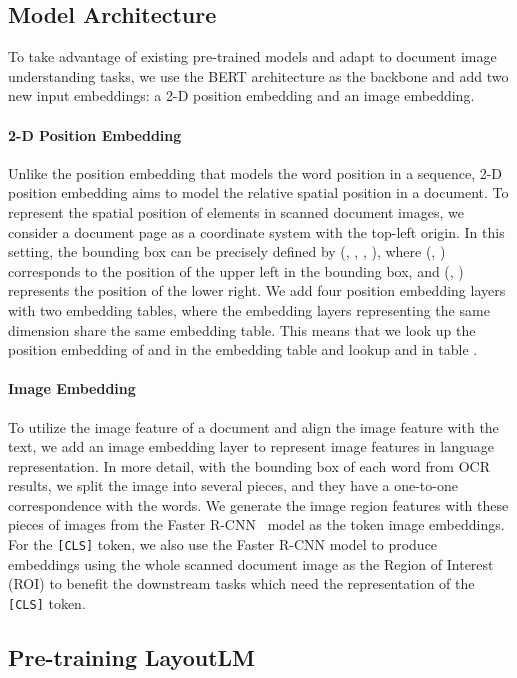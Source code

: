 \documentclass[sigconf]{acmart}
\begin{document}
\subsection{Model Architecture}
To take advantage of existing pre-trained models and adapt to document image understanding tasks, we use the BERT architecture as the backbone and add two new input embeddings: a 2-D position embedding and an image embedding.

\paragraph{2-D Position Embedding}
Unlike the position embedding that models the word position in a sequence, 2-D position embedding aims to model the relative spatial position in a document. To represent the spatial position of elements in scanned document images, we consider a document page as a coordinate system with the top-left origin. In this setting, the bounding box can be precisely defined by (, , , ), where (, ) corresponds to the position of the upper left in the bounding box, and (, ) represents the position of the lower right. We add four position embedding layers with two embedding tables, where the embedding layers representing the same dimension share the same embedding table. This means that we look up the position embedding of  and  in the embedding table  and lookup  and  in table .

\paragraph{Image Embedding} 
To utilize the image feature of a document and align the image feature with the text, we add an image embedding layer to represent image features in language representation. In more detail, with the bounding box of each word from OCR results, we split the image into several pieces, and they have a one-to-one correspondence with the words. We generate the image region features with these pieces of images from the Faster R-CNN~\citep{Ren2015FasterRT} model as the token image embeddings. For the {\tt[CLS]} token, we also use the Faster R-CNN model to produce embeddings using the whole scanned document image as the Region of Interest (ROI) to benefit the downstream tasks which need the representation of the {\tt[CLS]} token.

\subsection{Pre-training LayoutLM}
\end{document}
